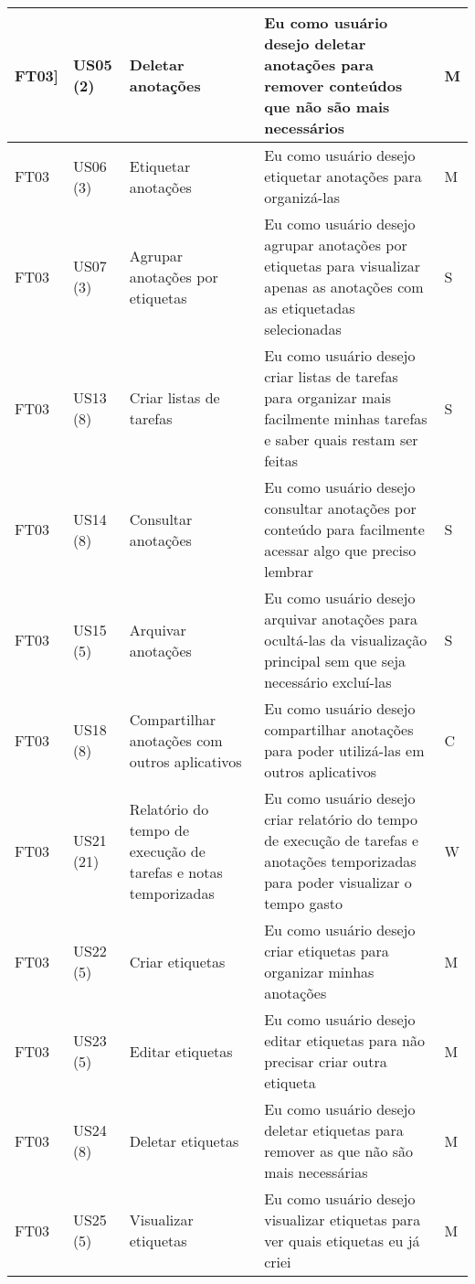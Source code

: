 \documentclass[
	12pt,				%
	oneside,			%
	a4paper,			%
	english,			%
	brazil,				%
	]{abntex2}
\begin{document}
\begin{longtable}{@{}p{}p{}p{}p{}p{}@{}}
FT03]& US05 (2) & Deletar anotações & Eu como usuário desejo deletar anotações para remover conteúdos que não são mais necessários & M\\ \midrule
FT03 & US06 (3) & Etiquetar anotações & Eu como usuário desejo etiquetar anotações para organizá-las & M\\ \midrule
FT03 & US07 (3) & Agrupar anotações por etiquetas & Eu como usuário desejo agrupar anotações por etiquetas para visualizar apenas as anotações com as etiquetadas selecionadas & S\\ \midrule
FT03 & US13 (8) & Criar listas de tarefas & Eu como usuário desejo criar listas de tarefas para organizar mais facilmente minhas tarefas e saber quais restam ser feitas & S\\ \midrule
FT03 & US14 (8) & Consultar anotações & Eu como usuário desejo consultar anotações por conteúdo para facilmente acessar algo que preciso lembrar & S\\ \midrule
FT03 & US15 (5) & Arquivar anotações & Eu como usuário desejo arquivar anotações para ocultá-las da visualização principal sem que seja necessário excluí-las & S\\ \midrule
FT03 & US18 (8) & Compartilhar anotações com outros aplicativos & Eu como usuário desejo compartilhar anotações para poder utilizá-las em outros aplicativos & C\\ \midrule
FT03 & US21 (21) & Relatório do tempo de execução de tarefas e notas temporizadas & Eu como usuário desejo criar relatório do tempo de execução de tarefas e anotações temporizadas para poder visualizar o tempo gasto & W\\ \midrule
FT03 & US22 (5) & Criar etiquetas & Eu como usuário desejo criar etiquetas para organizar minhas anotações & M\\ \midrule
FT03 & US23 (5) & Editar etiquetas & Eu como usuário desejo editar etiquetas para não precisar criar outra etiqueta & M\\ \midrule
FT03 & US24 (8) & Deletar etiquetas & Eu como usuário desejo deletar etiquetas para remover as que não são mais necessárias & M\\ \midrule
FT03 & US25 (5) & Visualizar etiquetas & Eu como usuário desejo visualizar etiquetas para ver quais etiquetas eu já criei & M\\ \midrule

\end{longtable}
\end{document}
